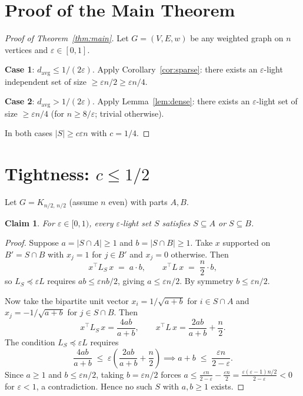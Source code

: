 \documentclass[12pt]{article}
\newtheorem{claim}[theorem]{Claim}
\theoremstyle{definition}
\theoremstyle{remark}
\begin{document}
\section{Proof of the Main Theorem}

\begin{proof}[Proof of Theorem~\ref{thm:main}]
Let $G = (V,E,w)$ be any weighted graph on $n$ vertices and $\varepsilon \in [0,1]$.

\textbf{Case 1}: $d_{\mathrm{avg}} \le 1/(2\varepsilon)$.
Apply Corollary~\ref{cor:sparse}: there exists an $\varepsilon$-light independent
set of size $\ge \varepsilon n/2 \ge \varepsilon n/4$.

\textbf{Case 2}: $d_{\mathrm{avg}} > 1/(2\varepsilon)$.
Apply Lemma~\ref{lem:dense}: there exists an $\varepsilon$-light set of size
$\ge \varepsilon n/4$ (for $n \ge 8/\varepsilon$; trivial otherwise).

In both cases $|S| \ge c\varepsilon n$ with $c = 1/4$.
\end{proof}

\section{Tightness: $c \le 1/2$}

Let $G = K_{n/2,\,n/2}$ (assume $n$ even) with parts $A, B$.

\begin{claim}
For $\varepsilon \in [0,1)$, every $\varepsilon$-light set $S$ satisfies $S \subseteq A$
or $S \subseteq B$.
\end{claim}

\begin{proof}
Suppose $a = |S \cap A| \ge 1$ and $b = |S \cap B| \ge 1$.  Take $x$ supported
on $B' = S \cap B$ with $x_j = 1$ for $j \in B'$ and $x_j = 0$ otherwise.
Then
\[
  x^\top L_S\,x \;=\; a \cdot b, \qquad
  x^\top L\, x \;=\; \frac{n}{2} \cdot b,
\]
so $L_S \preceq \varepsilon L$ requires $ab \le \varepsilon nb/2$, giving $a \le \varepsilon n/2$.
By symmetry $b \le \varepsilon n/2$.

Now take the bipartite unit vector $x_i = 1/\sqrt{a+b}$ for $i \in S \cap A$
and $x_j = -1/\sqrt{a+b}$ for $j \in S \cap B$.  Then
\[
  x^\top L_S\,x = \frac{4ab}{a+b}, \qquad
  x^\top L\,x = \frac{2ab}{a+b} + \frac{n}{2}.
\]
The condition $L_S \preceq \varepsilon L$ requires
\[
  \frac{4ab}{a+b} \;\le\; \varepsilon\!\left(\frac{2ab}{a+b}+\frac{n}{2}\right)
  \implies a + b \;\le\; \frac{\varepsilon n}{2-\varepsilon}.
\]
Since $a \ge 1$ and $b \le \varepsilon n/2$, taking $b = \varepsilon n/2$ forces
$a \le \frac{\varepsilon n}{2-\varepsilon} - \frac{\varepsilon n}{2} = \frac{\varepsilon(\varepsilon-1)n/2}{2-\varepsilon} < 0$
for $\varepsilon < 1$, a contradiction.  Hence no such $S$ with $a,b \ge 1$ exists.
\end{proof}
\end{document}

